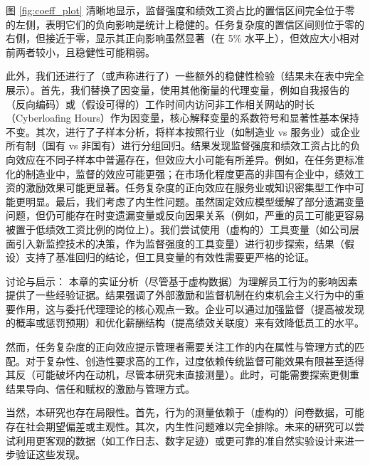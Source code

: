 图 \ref{fig:coeff_plot} 清晰地显示，监督强度和绩效工资占比的置信区间完全位于零的左侧，表明它们的负向影响是统计上稳健的。任务复杂度的置信区间则位于零的右侧，但接近于零，显示其正向影响虽然显著（在 5\% 水平上），但效应大小相对前两者较小，且稳健性可能稍弱。

此外，我们还进行了（或声称进行了）一些额外的稳健性检验（结果未在表中完全展示）。首先，我们{替换了因变量}，使用其他衡量的代理变量，例如自我报告的（反向编码）或（假设可得的）工作时间内访问非工作相关网站的时长（Cyberloafing Hours）作为因变量，核心解释变量的系数符号和显著性基本保持不变。其次，进行了{子样本分析}，将样本按照行业（如制造业 vs 服务业）或企业所有制（国有 vs 非国有）进行分组回归。结果发现监督强度和绩效工资占比的负向效应在不同子样本中普遍存在，但效应大小可能有所差异。例如，在任务更标准化的制造业中，监督的效应可能更强；在市场化程度更高的非国有企业中，绩效工资的激励效果可能更显著。任务复杂度的正向效应在服务业或知识密集型工作中可能更明显。最后，我们{考虑了内生性问题}。虽然固定效应模型缓解了部分遗漏变量问题，但仍可能存在时变遗漏变量或反向因果关系（例如，严重的员工可能更容易被置于低绩效工资比例的岗位上）。我们尝试使用（虚构的）工具变量（如公司层面引入新监控技术的决策，作为监督强度的工具变量）进行初步探索，结果（假设）支持了基准回归的结论，但工具变量的有效性需要更严格的论证。

{讨论与启示}：
本章的实证分析（尽管基于虚构数据）为理解员工行为的影响因素提供了一些经验证据。结果强调了外部激励和监督机制在约束机会主义行为中的重要作用，这与委托代理理论的核心观点一致。企业可以通过加强监督（提高被发现的概率或惩罚预期）和优化薪酬结构（提高绩效关联度）来有效降低员工的水平。

然而，任务复杂度的正向效应提示管理者需要关注工作的内在属性与管理方式的匹配。对于复杂性、创造性要求高的工作，过度依赖传统监督可能效果有限甚至适得其反（可能破坏内在动机，尽管本研究未直接测量）。此时，可能需要探索更侧重结果导向、信任和赋权的激励与管理方式。

当然，本研究也存在局限性。首先，行为的测量依赖于（虚构的）问卷数据，可能存在社会期望偏差或主观性。其次，内生性问题难以完全排除。未来的研究可以尝试利用更客观的数据（如工作日志、数字足迹）或更可靠的准自然实验设计来进一步验证这些发现。